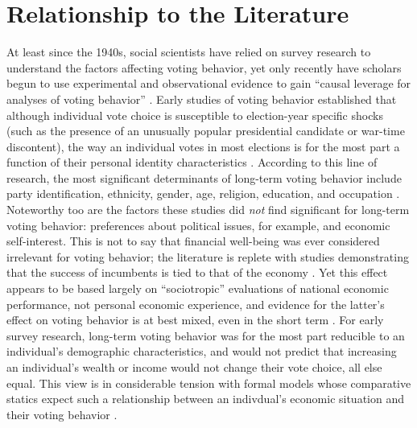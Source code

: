 \section{Relationship to the Literature}
At least since the 1940s, social scientists have relied on survey research to understand the factors affecting voting behavior, yet only recently have scholars begun to use experimental and observational evidence to gain ``causal leverage for analyses of voting behavior'' \parencite{Bartels2010}. Early studies of voting behavior established that although individual vote choice is susceptible to election-year specific shocks (such as the presence of an unusually popular presidential candidate or war-time discontent), the way an individual votes in most elections is for the most part a function of their personal identity characteristics \parencite{Converse1966}. According to this line of research, the most significant determinants of long-term voting behavior include party identification, ethnicity, gender, age, religion, education, and occupation \parencite{Lazarsfeld1948,Berelson1954,Campbell1960,Stanley2006a}. Noteworthy too are the factors these studies did \textit{not} find significant for long-term voting behavior: preferences about political issues, for example, and economic self-interest. This is not to say that financial well-being was ever considered irrelevant for voting behavior; the literature is replete with studies demonstrating that the success of incumbents is tied to that of the economy \parencite{Tufte1975,Meltzer1975,Hibbs1987}. Yet this effect appears to be based largely on ``sociotropic'' evaluations of national economic performance, not personal economic experience, and evidence for the latter's effect on voting behavior is at best mixed, even in the short term \parencite{Linn2010}.  For early survey research, long-term voting behavior was for the most part reducible to an individual's demographic characteristics, and would not predict that increasing an individual's wealth or income would not change their vote choice, all else equal.  This view is in considerable tension with formal models whose comparative statics expect such a relationship between an indivdual's economic situation and their voting behavior \parencite[e.g.,][]{Romer1975,Roberts1977,Meltzer1981}.

